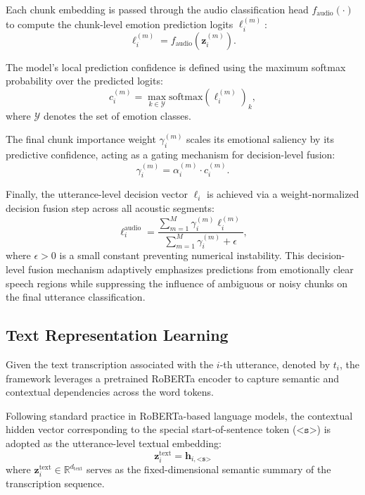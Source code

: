 Each chunk embedding is passed through the audio classification head $f_{\text{audio}}(\cdot)$ to compute the chunk-level emotion prediction logits $\mathbf{\ell}_i^{(m)}$:
\begin{equation}
	\mathbf{\ell}_i^{(m)} = f_{\text{audio}}(\mathbf{z}_i^{(m)}).
\end{equation}

The model's local prediction confidence is defined using the maximum softmax probability over the predicted logits:
\begin{equation}
	c_i^{(m)} = \max_{k \in \mathcal{Y}} \text{softmax}(\mathbf{\ell}_i^{(m)})_k,
\end{equation}
where $\mathcal{Y}$ denotes the set of emotion classes. 

The final chunk importance weight $\gamma_i^{(m)}$ scales its emotional saliency by its predictive confidence, acting as a gating mechanism for decision-level fusion:
\begin{equation}
	\gamma_i^{(m)} = \alpha_i^{(m)} \cdot c_i^{(m)}.
\end{equation}

Finally, the utterance-level decision vector $\mathbf{\ell}_i$ is achieved via a weight-normalized decision fusion step across all acoustic segments:
\begin{equation}
	\mathbf{\ell}_i^{\text{audio}} = \frac{\sum_{m=1}^{M} \gamma_i^{(m)} \mathbf{\ell}_i^{(m)}}{\sum_{m=1}^{M} \gamma_i^{(m)} + \epsilon},
\end{equation}
where $\epsilon > 0$ is a small constant preventing numerical instability. This decision-level fusion mechanism adaptively emphasizes predictions from emotionally clear speech regions while suppressing the influence of ambiguous or noisy chunks on the final utterance classification. 


\subsection{Text Representation Learning}
Given the text transcription associated with the $i$-th utterance, denoted by $t_i$, the framework leverages a pretrained RoBERTa encoder to capture semantic and contextual dependencies across the word tokens.

Following standard practice in RoBERTa-based language models, the contextual hidden vector corresponding to the special start-of-sentence token ($\texttt{<s>}$) is adopted as the utterance-level textual embedding:
\begin{equation}
	\mathbf{z}_i^{\text{text}} = \mathbf{h}_{i,\texttt{<s>}}
\end{equation}
where $\mathbf{z}_i^{\text{text}} \in \mathbb{R}^{d_{\text{text}}}$ serves as the fixed-dimensional semantic summary of the transcription sequence.

